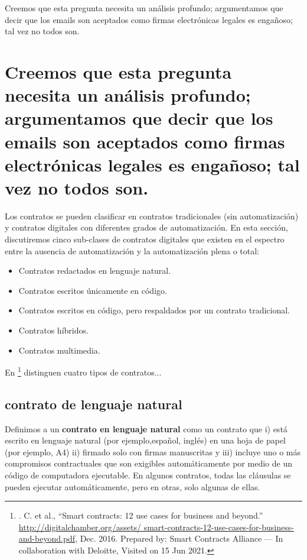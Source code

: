 \documentclass[12pt]{report} %
\begin{document}
\begin{itemize}
Creemos que esta pregunta necesita un análisis profundo; argumentamos que decir que los emails son aceptados como firmas electrónicas legales es engañoso; tal vez no todos son.

\section{Creemos que esta pregunta necesita un análisis profundo; argumentamos que decir que los emails son aceptados como firmas electrónicas legales es engañoso; tal vez no todos son.}


Los contratos se pueden clasificar en contratos tradicionales (sin automatización) y contratos digitales con diferentes grados de automatización. En esta sección, discutiremos cinco sub-clases de contratos digitales que existen en el espectro entre la ausencia de automatización y la automatización plena o total:

\begin{itemize}
    \item Contratos redactados en lenguaje natural.
    \item Contratos escritos únicamente en código.
    \item Contratos escritos en código, pero respaldados por un contrato tradicional.
    \item Contratos híbridos.
    \item Contratos multimedia.   
\end{itemize}

En \footnote{. C. et al., “Smart contracts: 12 use cases for business and beyond.” \url{http://digitalchamber.org/assets/ smart-contracts-12-use-cases-for-business-and-beyond.pdf}, Dec. 2016. Prepared by: Smart Contracts Alliance — In collaboration with Deloitte, Visited on 15 Jun 2021.}  distinguen cuatro tipos de contratos...

\subsection{contrato de lenguaje natural}

Definimos a un \textbf{contrato en lenguaje natural} como un contrato que i) está escrito en lenguaje natural (por ejemplo,español, inglés) en una hoja de papel (por ejemplo, A4) ii) firmado solo con firmas manuscritas y iii) incluye uno o más compromisos contractuales que son exigibles automáticamente por medio de un código de computadora ejecutable. En algunos contratos, todas las cláusulas se pueden ejecutar  automáticamente, pero en otras, solo algunas de ellas.



\end{itemize}
\end{document}
